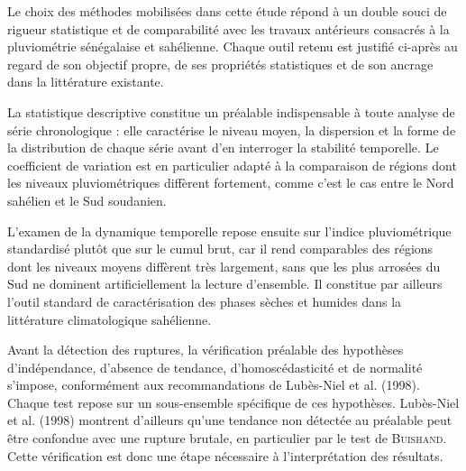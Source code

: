 \documentclass[12pt,a4paper]{report}
\begin{document}
Le choix des méthodes mobilisées dans cette étude répond à un double souci de rigueur statistique et de comparabilité avec les travaux antérieurs consacrés à la pluviométrie sénégalaise et sahélienne. Chaque outil retenu est justifié ci-après au regard de son objectif propre, de ses propriétés statistiques et de son ancrage dans la littérature existante.

La statistique descriptive constitue un préalable indispensable à toute analyse de série chronologique : elle caractérise le niveau moyen, la dispersion et la forme de la distribution de chaque série avant d'en interroger la stabilité temporelle. Le coefficient de variation est en particulier adapté à la comparaison de régions dont les niveaux pluviométriques diffèrent fortement, comme c'est le cas entre le Nord sahélien et le Sud soudanien.

L'examen de la dynamique temporelle repose ensuite sur l'indice pluviométrique standardisé plutôt que sur le cumul brut, car il rend comparables des régions dont les niveaux moyens diffèrent très largement, sans que les plus arrosées du Sud ne dominent artificiellement la lecture d'ensemble. Il constitue par ailleurs l'outil standard de caractérisation des phases sèches et humides dans la littérature climatologique sahélienne.

Avant la détection des ruptures, la vérification préalable des hypothèses d'indépendance, d'absence de tendance, d'homoscédasticité et de normalité s'impose, conformément aux recommandations de Lubès-Niel et al. (1998). Chaque test repose sur un sous-ensemble spécifique de ces hypothèses. Lubès-Niel et al. (1998) montrent d'ailleurs qu'une tendance non détectée au préalable peut être confondue avec une rupture brutale, en particulier par le test de \textsc{Buishand}. Cette vérification est donc une étape nécessaire à l’interprétation des résultats.
\end{document}
